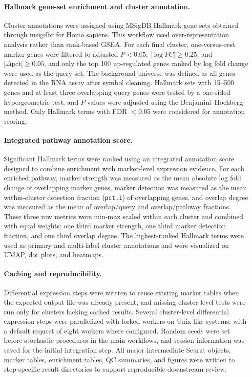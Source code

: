 \documentclass[11pt]{article}
\begin{document}
\paragraph{Hallmark gene-set enrichment and cluster annotation.}
Cluster annotations were assigned using MSigDB Hallmark gene sets obtained through msigdbr for Homo sapiens. This workflow used over-representation analysis rather than rank-based GSEA. For each final cluster, one-versus-rest marker genes were filtered to adjusted \(P < 0.05\), \(|\log FC| \geq 0.25\), and \(|\Delta \mathrm{pct}| \geq 0.05\), and only the top 100 up-regulated genes ranked by log fold change were used as the query set. The background universe was defined as all genes detected in the RNA assay after symbol cleaning. Hallmark sets with 15--500 genes and at least three overlapping query genes were tested by a one-sided hypergeometric test, and \(P\) values were adjusted using the Benjamini--Hochberg method. Only Hallmark terms with FDR \(< 0.05\) were considered for annotation scoring.

\paragraph{Integrated pathway annotation score.}
Significant Hallmark terms were ranked using an integrated annotation score designed to combine enrichment with marker-level expression evidence. For each enriched pathway, marker strength was measured as the mean absolute log fold change of overlapping marker genes, marker detection was measured as the mean within-cluster detection fraction (\texttt{pct.1}) of overlapping genes, and overlap degree was measured as the mean of overlap/query and overlap/pathway fractions. These three raw metrics were min-max scaled within each cluster and combined with equal weights: one third marker strength, one third marker detection fraction, and one third overlap degree. The highest-ranked Hallmark terms were used as primary and multi-label cluster annotations and were visualized on UMAP, dot plots, and heatmaps.

\paragraph{Caching and reproducibility.}
Differential expression steps were written to reuse existing marker tables when the expected output file was already present, and missing cluster-level tests were run only for clusters lacking cached results. Several cluster-level differential expression steps were parallelized with forked workers on Unix-like systems, with a default request of eight workers where configured. Random seeds were set before stochastic procedures in the main workflows, and session information was saved for the initial integration step. All major intermediate Seurat objects, marker tables, enrichment tables, QC summaries, and figures were written to step-specific result directories to support reproducible downstream review.
\end{document}
